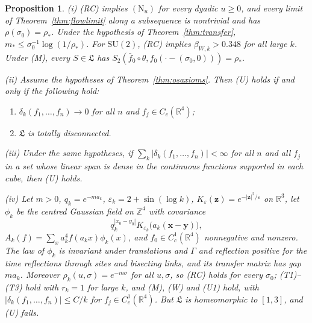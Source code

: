 \documentclass[aps,prd,twocolumn,superscriptaddress,nofootinbib,longbibliography,floatfix,amsmath,amssymb,10pt]{revtex4-2}
\newtheorem{proposition}[theorem]{Proposition}
\theoremstyle{definition}
\theoremstyle{remark}
\newcommand{\R}{\mathbb{R}}
\newcommand{\Z}{\mathbb{Z}}
\newcommand{\SU}{\mathrm{SU}}
\begin{document}
\begin{proposition}\label{prop:tuned}
\textup{(i)} \textup{(RC)} implies $(\mathrm N_u)$ for every dyadic
$u\ge0$, and every limit of Theorem~\textup{\ref{thm:flowlimit}} along a
subsequence is nontrivial and has $\rho(\sigma_0)=\rho_*$. Under the
hypothesis of Theorem~\textup{\ref{thm:transfer}}, $m_*\le\sigma_0^{-1}
\log(1/\rho_*)$. For $\SU(2)$, \textup{(RC)} implies $\beta_{W,k}>0.348$
for all large $k$. Under \textup{(M)}, every $S\in\mathfrak L$ has
$S_2(\bar f_0\circ\theta,f_0(\cdot-(\sigma_0,0)))=\rho_*$.

\textup{(ii)} Assume the hypotheses of
Theorem~\textup{\ref{thm:osaxioms}}. Then \textup{(U)} holds if and only if
the following hold:
\begin{enumerate}[label=\textup{(U\arabic*)},leftmargin=*]
\item $\delta_k(f_1,\dots,f_n)\to0$ for all $n$ and $f_j\in C_c(\R^4)$;
\item $\mathfrak L$ is totally disconnected.
\end{enumerate}

\textup{(iii)} Under the same hypotheses, if
$\sum_k|\delta_k(f_1,\dots,f_n)|<\infty$ for all $n$ and all $f_j$ in a
set whose linear span is dense in the continuous functions supported in
each cube, then \textup{(U)} holds.

\textup{(iv)} Let $m>0$, $q_k=e^{-ma_k}$, $\varepsilon_k=2+\sin(\log k)$,
$K_\varepsilon(\mathbf z)=e^{-|\mathbf z|^2/\varepsilon}$ on $\R^3$, let
$\phi_k$ be the centred Gaussian field on $\Z^4$ with covariance
\[
q_k^{|x_0-y_0|}K_{\varepsilon_k}\bigl(a_k(\mathbf x-\mathbf y)\bigr),
\]
$A_k(f)=\sum_xa_k^4f(a_kx)\phi_k(x)$, and $f_0\in C^1_c(\R^4)$ nonnegative and nonzero. The law of
$\phi_k$ is invariant under translations and $\Gamma$ and reflection
positive for the time reflections through sites and bisecting links, and
its transfer matrix has gap $ma_k$. Moreover $\rho_k(u,\sigma)=
e^{-m\sigma}$ for all $u,\sigma$, so \textup{(RC)} holds for every
$\sigma_0$; \textup{(T1)--(T3)} hold with $r_k=1$ for large $k$, and
\textup{(M)}, \textup{(W)} and \textup{(U1)} hold, with
$|\delta_k(f_1,\dots,f_n)|\le C/k$ for $f_j\in C^1_c(\R^4)$. But
$\mathfrak L$ is homeomorphic to $[1,3]$, and \textup{(U)} fails.
\end{proposition}
\end{document}

